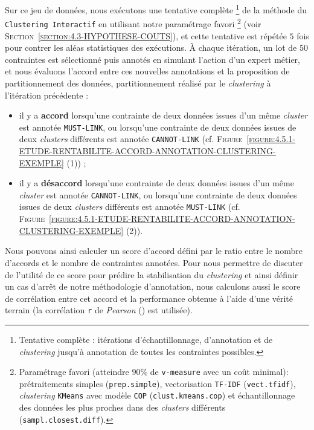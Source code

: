 			Sur ce jeu de données, nous exécutons une tentative complète \footnote{
				Tentative complète : itérations d'échantillonnage, d'annotation et de \textit{clustering} jusqu'à annotation de toutes les contraintes possibles.
			}
			de la méthode du \texttt{Clustering Interactif} en utilisant notre paramétrage favori \footnote{
				Paramétrage favori (atteindre $90$\% de \texttt{v-measure} avec un coût minimal): prétraitements simples (\texttt{prep.simple}), vectorisation \texttt{TF-IDF} (\texttt{vect.tfidf}), \textit{clustering} \texttt{KMeans} avec modèle \texttt{COP} (\texttt{clust.kmeans.cop}) et échantillonnage des données les plus proches dans des \textit{clusters} différents (\texttt{sampl.closest.diff}).
			} (voir \textsc{Section~\ref{section:4.3-HYPOTHESE-COUTS}}), et cette tentative est répétée $5$ fois pour contrer les aléas statistiques des exécutions.
			À chaque itération, un lot de $50$ contraintes est sélectionné puis annotés en simulant l'action d'un expert métier, et nous évaluons l'accord entre ces nouvelles annotations et la proposition de partitionnement des données, partitionnement réalisé par le \textit{clustering} à l'itération précédente :
			\begin{itemize}
				\item il y a \textbf{accord} lorsqu'une contrainte de deux données issues d'un même \textit{cluster} est annotée \texttt{MUST-LINK}, ou lorsqu'une contrainte de deux données issues de deux \textit{clusters} différents est annotée \texttt{CANNOT-LINK} (cf. \textsc{Figure~\ref{figure:4.5.1-ETUDE-RENTABILITE-ACCORD-ANNOTATION-CLUSTERING-EXEMPLE} (1)}) ;
				\item il y a \textbf{désaccord} lorsqu'une contrainte de deux données issues d'un même \textit{cluster} est annotée \texttt{CANNOT-LINK}, ou lorsqu'une contrainte de deux données issues de deux \textit{clusters} différents est annotée \texttt{MUST-LINK} (cf. \textsc{Figure~\ref{figure:4.5.1-ETUDE-RENTABILITE-ACCORD-ANNOTATION-CLUSTERING-EXEMPLE} (2)}).
			\end{itemize}
			Nous pouvons ainsi calculer un score d'accord défini par le ratio entre le nombre d'accords et le nombre de contraintes annotées.
			Pour nous permettre de discuter de l'utilité de ce score pour prédire la stabilisation du \textit{clustering} et ainsi définir un cas d'arrêt de notre méthodologie d'annotation, nous calculons aussi le score de corrélation entre cet accord et la performance obtenue à l'aide d'une vérité terrain (la corrélation \texttt{r} de \textit{Pearson} (\cite{kirch:2008:pearson-correlation-coefficient}) est utilisée).

